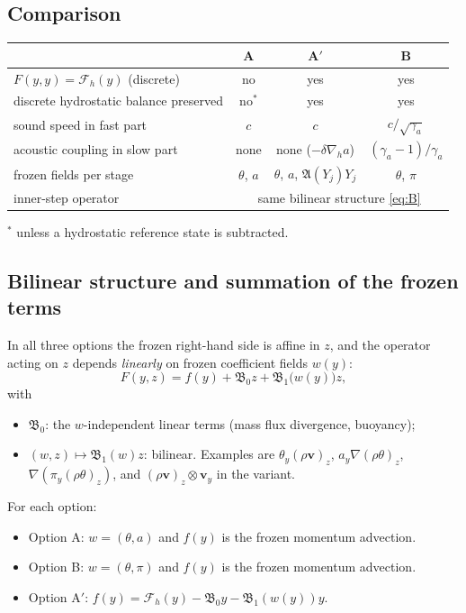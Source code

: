 \documentclass[11pt,a4paper]{article}
\theoremstyle{definition}
\theoremstyle{remark}
\begin{document}
\subsection{Comparison}

\begin{center}
\begin{tabular}{lccc}
\toprule
 & A & A$'$ & B\\
\midrule
$F(y,y)=\mathcal F_h(y)$ (discrete) & no & yes & yes\\
discrete hydrostatic balance preserved & no$^{*}$ & yes & yes\\
sound speed in fast part & $c$ & $c$ & $c/\sqrt{\gamma_a}$\\
acoustic coupling in slow part & none & none ($-\delta\nabla_h a$) & $(\gamma_a-1)/\gamma_a$\\
frozen fields per stage & $\theta$, $a$ & $\theta$, $a$, $\mathfrak A(Y_j)Y_j$ & $\theta$, $\pi$\\
inner-step operator & \multicolumn{3}{c}{same bilinear structure \eqref{eq:B}}\\
\bottomrule
\end{tabular}

\smallskip
{\small $^*$ unless a hydrostatic reference state is subtracted.}
\end{center}

\subsection{Bilinear structure and summation of the frozen terms}
\label{sec:bilinear}

In all three options the frozen right-hand side is affine in $z$, and
the operator acting on $z$ depends \emph{linearly} on frozen coefficient
fields $w(y)$:
\begin{equation}\label{eq:bilinear}
 F(y,z)=f(y)+\mathfrak B_0z+\mathfrak B_1\big(w(y)\big)z ,
\end{equation}
with
\begin{itemize}
\item $\mathfrak B_0$: the $w$-independent linear terms (mass flux
  divergence, buoyancy);
\item $(w,z)\mapsto\mathfrak B_1(w)z$: bilinear. Examples are
  $\theta_y(\rho\mathbf v)_z$, $a_y\nabla(\rho\theta)_z$,
  $\nabla(\pi_y(\rho\theta)_z)$, and $(\rho\mathbf v)_z\otimes\mathbf v_y$
  in the variant.
\end{itemize}
For each option:
\begin{itemize}
\item Option A: $w=(\theta,a)$ and $f(y)$ is the frozen momentum
  advection.
\item Option B: $w=(\theta,\pi)$ and $f(y)$ is the frozen momentum
  advection.
\item Option A$'$: $f(y)=\mathcal F_h(y)-\mathfrak B_0y-\mathfrak B_1(w(y))y$.
\end{itemize}
\end{document}
